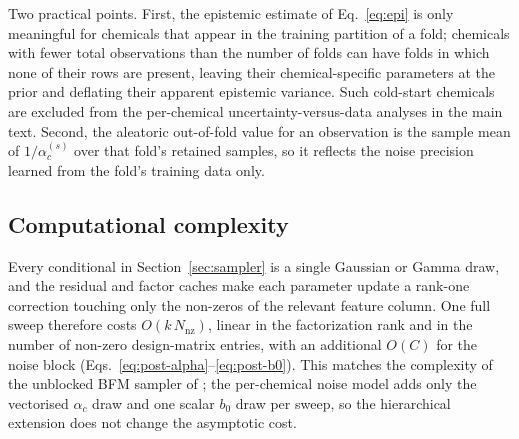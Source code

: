 Two practical points. First, the epistemic estimate of Eq.~\eqref{eq:epi} is only
meaningful for chemicals that appear in the training partition of a fold;
chemicals with fewer total observations than the number of folds can have folds
in which none of their rows are present, leaving their chemical-specific
parameters at the prior and deflating their apparent epistemic variance. Such
cold-start chemicals are excluded from the per-chemical
uncertainty-versus-data analyses in the main text. Second, the aleatoric
out-of-fold value for an observation is the sample mean of
$1/\alpha_{c}^{(s)}$ over that fold's retained samples, so it reflects the noise
precision learned from the fold's training data only.

\subsection{Computational complexity}
\label{sec:complexity}

Every conditional in Section~\ref{sec:sampler} is a single Gaussian or Gamma
draw, and the residual and factor caches make each parameter update a rank-one
correction touching only the non-zeros of the relevant feature column. One full
sweep therefore costs $O(k\,N_{\mathrm{nz}})$, linear in the factorization rank
and in the number of non-zero design-matrix entries, with an additional
$O(C)$ for the noise block (Eqs.~\ref{eq:post-alpha}--\ref{eq:post-b0}). This
matches the complexity of the unblocked BFM sampler of
\citet{rendle2011bayesian}; the per-chemical noise model adds only the vectorised
$\alpha_c$ draw and one scalar $b_0$ draw per sweep, so the hierarchical
extension does not change the asymptotic cost.

